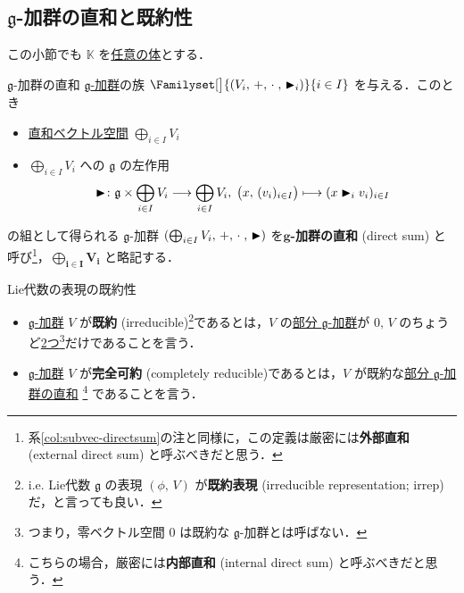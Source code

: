 \documentclass[rep_main]{subfiles}
\begin{document}
\subsection{$\mathfrak{g}$-加群の直和と既約性}

この小節でも $\mathbb{K}$ を\underline{任意の体}とする．

\begin{mydef}[label=def:gmod-directsum,breakable]{$\mathfrak{g}$-加群の直和}
	\hyperref[ax:g-module]{ $\mathfrak{g}$-加群}の族 $\Familyset[\big]{(V_i,\, +,\, \cdot\;,\, \btr_i)}{i \in I}$ を与える．このとき
	\begin{itemize}
		\item \hyperref[def:univ-vec-sum]{直和ベクトル空間} $\bigoplus_{i \in I} V_i$
		\item $\bigoplus_{i \in I} V_i$ への $\mathfrak{g}$ の左作用
		\begin{align}
			\blacktriangleright \colon \mathfrak{g} \times \bigoplus_{i \in I} V_i \longrightarrow \bigoplus_{i \in I} V_i,\; \bigl(x,\, (v_i)_{i \in I}\bigr) \longmapsto (x \blacktriangleright_i v_i)_{i \in I}
		\end{align}
	\end{itemize}
	の組として得られる $\mathfrak{g}$-加群 $(\bigoplus_{i \in I} V_i,\, +,\, \cdot\;,\, \blacktriangleright)$ を\textbf{$\mathfrak{\bm{g}}$-加群の直和} (direct sum) と呼び\footnote{系\ref{col:subvec-directsum}の注と同様に，この定義は厳密には\textbf{外部直和} (external direct sum) と呼ぶべきだと思う．}，$\bm{\bigoplus_{i \in I} V_i}$ と略記する．
\end{mydef}

\begin{mydef}[label=def:irr]{Lie代数の表現の既約性}
    \begin{itemize}
		\item \hyperref[ax:g-module]{ $\mathfrak{g}$-加群} $V$ が\textbf{既約} (irreducible)\footnote{i.e. Lie代数 $\mathfrak{g}$ の表現 $(\phi,\, V)$ が\textbf{既約表現} (irreducible representation; irrep) だ，と言っても良い．}であるとは，$V$ の\hyperref[def:sub-g-module]{部分 $\mathfrak{g}$-加群}が $0,\, V$ のちょうど\underline{2つ}\footnote{つまり，零ベクトル空間 $0$ は既約な $\mathfrak{g}$-加群とは呼ばない．}だけであることを言う．
		\item \hyperref[ax:g-module]{ $\mathfrak{g}$-加群} $V$ が\textbf{完全可約} (completely reducible)であるとは，$V$ が既約な\hyperref[def:gmod-directsum]{部分 $\mathfrak{g}$-加群の直和}
		\footnote{こちらの場合，厳密には\textbf{内部直和} (internal direct sum) と呼ぶべきだと思う．}
		であることを言う．
	\end{itemize}
\end{mydef}
\end{document}
